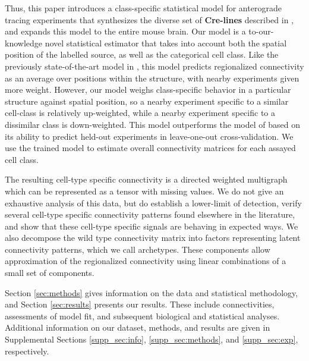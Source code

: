 Thus, this paper introduces a class-specific statistical model for anterograde tracing experiments that synthesizes the diverse set of \textbf{Cre-lines} described in \citet{Harris2019-mr}, and expands this model to the entire mouse brain.
Our model is a to-our-knowledge novel statistical estimator that takes into account both the spatial position of the labelled source, as well as the categorical cell class.
Like the previously state-of-the-art model in \citet{Knox2019-ot}, this model predicts regionalized connectivity as an average over positions within the structure, with nearby experiments given more weight.
However, our model weighs class-specific behavior in a particular structure against spatial position, so a nearby experiment specific to a similar cell-class is relatively up-weighted, while a nearby experiment specific to a dissimilar class is down-weighted.
This model outperforms the model of  \citet{Knox2019-ot} based on its ability to predict held-out experiments in leave-one-out cross-validation.
We use the trained model to estimate overall connectivity matrices for each assayed cell class.

The resulting cell-type specific connectivity is a directed weighted multigraph which can be represented as a tensor with missing values.
We do not give an exhaustive analysis of this data, but do establish a lower-limit of detection, verify several cell-type specific connectivity patterns found elsewhere in the literature, and show that these cell-type specific signals are behaving in expected ways.
We also decompose the wild type connectivity matrix into factors representing latent connectivity patterns, which we call archetypes.
These components allow approximation of the regionalized connectivity using linear combinations of a small set of components.

Section \ref{sec:methods} gives information on the data and statistical methodology, and Section \ref{sec:results} presents our results.
These include connectivities, assessments of model fit, and subsequent biological and statistical analyses.
Additional information on our dataset, methods, and results are given in Supplemental Sections \ref{supp_sec:info}, \ref{supp_sec:methods}, and \ref{supp_sec:exp}, respectively.